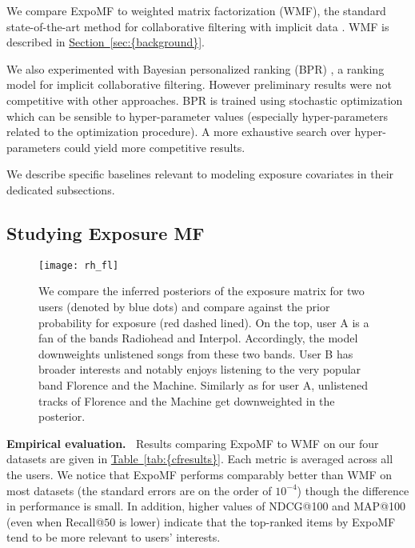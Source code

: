 \documentclass{sig-alternate-arxiv}
\begin{document}
We compare ExpoMF to weighted matrix factorization (WMF), the standard
state-of-the-art method for collaborative filtering with implicit data
\cite{hu2008collaborative}. WMF is described in {\hyperref[sec:{background}]{Section~\ref*{sec:{background}}}}.

We also experimented with Bayesian personalized ranking (BPR)
\cite{rendle2009bpr}, a ranking model for implicit collaborative filtering. However preliminary results were not competitive with other
approaches. BPR is trained using stochastic optimization which can be
sensible to hyper-parameter values (especially hyper-parameters related to
the optimization procedure). A more exhaustive search over hyper-parameters
could yield more competitive results. 

We describe specific baselines relevant to modeling exposure covariates
in their dedicated subsections.

\subsection{Studying Exposure MF} 
\label{sec:expomf_study}

\begin{figure*}[!tbp]
  \centering
   \texttt{[image: rh\_fl]}
   \caption{We compare the inferred posteriors of the exposure matrix for two
  users (denoted by blue dots) and compare against the prior probability for exposure (red dashed lined). On the top, user A is a fan of the bands Radiohead and Interpol. 
  Accordingly, the model downweights unlistened songs from these two
  bands. User B has broader interests and notably enjoys listening to
  the very popular band Florence and the Machine. Similarly as for user A,
  unlistened tracks of Florence and the Machine get downweighted in the
   posterior.}
  \label{fig:expo_exp}
\end{figure*}

{\vspace{0.1in}\noindent \textbf{{Empirical evaluation.} \,}} Results comparing ExpoMF to WMF on our four
datasets are given in
{\hyperref[tab:{cfresults}]{Table~\ref*{tab:{cfresults}}}}. Each metric is averaged across all the users.
We notice that ExpoMF performs comparably better than WMF on most
datasets (the standard errors are on the order of $10^{-4}$) though the difference in performance is small. In addition, higher values
of NDCG@100 and MAP@100 (even when Recall@$50$ is lower) indicate that the
top-ranked items by ExpoMF tend to be more relevant to users' interests.  
\end{document}
